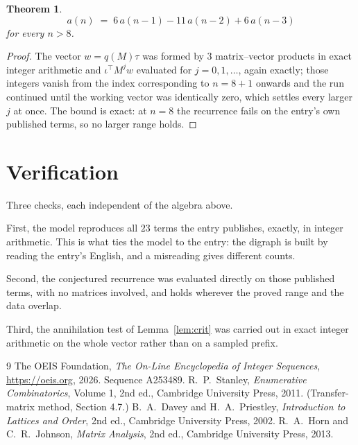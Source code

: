 \documentclass[11pt,a4paper]{article}
\theoremstyle{plain}
\newtheorem{theorem}{Theorem}
\theoremstyle{definition}
\begin{document}
\begin{theorem}
\[
a(n)\;=\;6\,a(n-1) - 11\,a(n-2) + 6\,a(n-3)
\]
for every $n>8$.
\end{theorem}

\begin{proof}
The vector $w=q(M)\tau$ was formed by $3$ matrix--vector products in exact integer
arithmetic and $\iota^{\!\top}M^{j}w$ evaluated for $j=0,1,\dots$, again exactly; those
integers vanish from the index corresponding to $n=8+1$ onwards and the run continued
until the working vector was identically zero, which settles every larger $j$ at once. The bound is exact: at $n=8$ the recurrence fails on the entry's own published terms, so no larger range holds.
\end{proof}

\section{Verification}

Three checks, each independent of the algebra above.

First, the model reproduces all $23$ terms the entry publishes, exactly, in integer
arithmetic. This is what ties the model to the entry: the digraph is built by reading the
entry's English, and a misreading gives different counts.

Second, the conjectured recurrence was evaluated directly on those published terms, with no
matrices involved, and holds wherever the proved range and the data overlap.

Third, the annihilation test of Lemma~\ref{lem:crit} was carried out in exact integer
arithmetic on the whole vector rather than on a sampled prefix.

\begin{thebibliography}{9}
 The OEIS Foundation, \emph{The On-Line Encyclopedia of Integer
Sequences}, \url{https://oeis.org}, 2026. Sequence A253489.
 R.~P.~Stanley, \emph{Enumerative Combinatorics}, Volume 1, 2nd ed.,
Cambridge University Press, 2011. (Transfer-matrix method, Section 4.7.)
 B.~A.~Davey and H.~A.~Priestley, \emph{Introduction to Lattices and
Order}, 2nd ed., Cambridge University Press, 2002.
 R.~A.~Horn and C.~R.~Johnson, \emph{Matrix Analysis}, 2nd ed., Cambridge
University Press, 2013.
\end{thebibliography}
\end{document}
